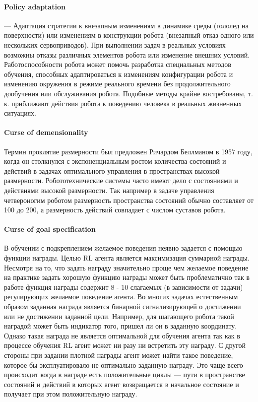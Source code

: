 \paragraph{Policy adaptation} --- Адаптация стратегии к внезапным изменениям в динамике среды (гололед на поверхности) или изменениям в конструкции робота (внезапный отказ одного или нескольких сервоприводов). При выполнении задач в реальных условиях возможны отказы различных элементов робота или изменение внешних условий. Работоспособности робота может помочь разработка специальных методов обучения, способных адаптироваться к изменениям конфигурации робота и изменению окружения в режиме реального времени без продолжительного дообучения или обслуживания робота. Подобные методы крайне востребованы, т. к. приближают действия робота к поведению человека в реальных жизненных ситуациях.

\paragraph{Curse of demensionality}

Термин проклятие размерности был предложен Ричардом Беллманом в 1957 году, когда он столкнулся с экспоненциальным ростом количества состояний и действий в задачах оптимального управления в пространствах высокой размерности. Робототехнические системы часто имеют дело с состояниями и действиями высокой размерности. Так например в задаче управления четвероногим роботом размерность пространства состояний обычно составляет от 100 до 200, а размерность действий совпадает с числом суставов робота. 

\paragraph{Curse of goal specification}
В обучении с подкреплением желаемое поведения неявно задается с помощью функции награды. Целью RL агента является максимизация суммарной награды. Несмотря на то, что задать награду значительно проще чем желаемое поведение на практике задать хорошую функцию награды может быть проблематично так в работе \cite{hwangbo2019learning} функция награды содержит 8 - 10 слагаемых (в зависимости от задачи) регулирующих желаемое поведение агента. 
Во многих задачах естественным образом заданная награда является бинарной сигнализирующей о достижении или не достижении заданной цели. Например, для шагающего робота такой наградой может быть индикатор того, пришел ли он в заданную координату. Однако такая награда не является оптимальной для обучения агента так как в процессе обучения RL агент может ни разу ни встретить эту награду. 
С другой стороны при задании плотной награды агент может найти такое поведение, которое бы эксплуатировало не оптимально заданную награду. Это чаще всего происходит когда в награде есть положительные циклы --- пути в пространстве состояний и действий в которых агент возвращается в начальное состояние и получает при этом положительную награду. 




\FloatBarrier
